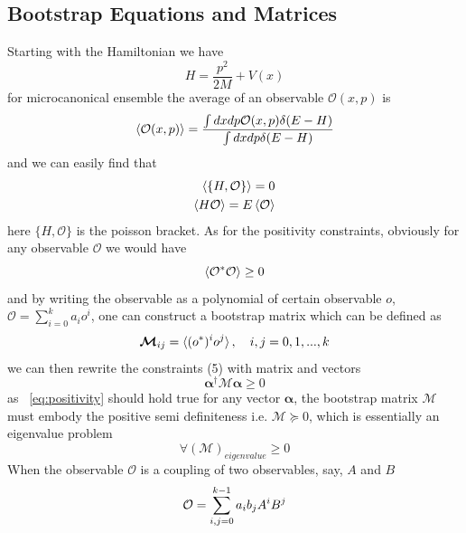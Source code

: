 \documentclass[aps, preprint,amsmath, amssymb]{revtex4-2}
\begin{document}
\subsection{Bootstrap Equations and Matrices}
Starting with the Hamiltonian we have
\begin{equation}
    H = \frac{p^2}{2M} + V(x)\label{eq:hamiltonian}
\end{equation}
for microcanonical ensemble the average of an observable $\mathcal{O}(x, p)$ is
\begin{equation}
    \braket{\mathcal{O}(x, p)} = \frac{\int dxdp\mathcal{O}(x, p)\delta (E - H)}{\int dxdp\delta (E - H)}
\end{equation}
and we can easily find that
\begin{align}
    \braket{\{H, \mathcal{O}\}} = 0 \label{eq:beq0}\\
    \braket{H \mathcal{O}} = E \braket{\mathcal{O}} \label{eq:beq1}
\end{align}
here $\{H, \mathcal{O}\}$ is the poisson bracket.
As for the positivity constraints, obviously for any observable $\mathcal{O}$ we would have
\begin{equation}
    \braket{\mathcal{O}^* \mathcal{O}} \geq 0 \label{eq:pos}
\end{equation}
and by writing the observable as a polynomial of certain observable $o$, $\mathcal{O} = \sum_{i = 0}^k a_i o^i$, one can construct a bootstrap matrix which can be defined as
\begin{equation}
    \bm{\mathcal{M}}_{ij} = \braket{(o^*)^i o^j}, \ \ \ i, j = 0, 1, ..., k
\end{equation}
we can then rewrite the constraints (5) with matrix and vectors
\begin{equation}
    \bm{\alpha}^\dagger \bm{\mathcal{M} \bm{\alpha}} \geq 0\label{eq:positivity}
\end{equation}
as ~\eqref{eq:positivity} should hold true for any vector $\bm{\alpha}$, the bootstrap matrix $\bm{\mathcal{M}}$ must embody the positive semi definiteness i.e. $\bm{\mathcal{M}} \succeq 0$, which is essentially an eigenvalue problem
\begin{equation}
    \forall (\bm{\mathcal{M}})_{eigenvalue} \geq 0
\end{equation}
When the observable $\mathcal{O}$ is a coupling of two observables, say, $A$ and $B$
\begin{equation}
    \mathcal{O} = \sum_{i, j = 0}^{k - 1} a_i b_j A^i B^j\\
\end{equation}
\end{document}
